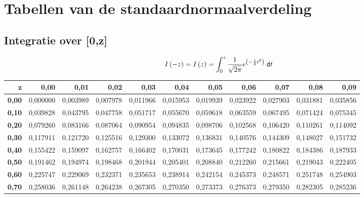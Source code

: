 \newpage
\section{Tabellen van de standaardnormaalverdeling}
\label{sec:Tabellen}

\subsection{Integratie over [0,z]}
\label{sec:EersteTabel}
  \normalsize
  \[
    I\left(-z\right) = I\left(z\right)= \int_0^z \frac{1}{\sqrt{2\pi}} e^{\left( -\frac{1}{2} t^2 \right)}\;\textsf{d}t
  \]
  \footnotesize
  
\begin{tabular}{|r||rrrrr|rrrrr|}
\hline
   {\bf z} & {\bf 0,00} & {\bf 0,01} & {\bf 0,02} & {\bf 0,03} & {\bf 0,04} & {\bf 0,05} & {\bf 0,06} & {\bf 0,07} & {\bf 0,08} & {\bf 0,09} \\
\hline \hline 
{\bf 0,00} &   0,000000 &   0,003989 &   0,007978 &   0,011966 &   0,015953 &   0,019939 &   0,023922 &   0,027903 &   0,031881 &   0,035856 \\

{\bf 0,10} &   0,039828 &   0,043795 &   0,047758 &   0,051717 &   0,055670 &   0,059618 &   0,063559 &   0,067495 &   0,071424 &   0,075345 \\

{\bf 0,20} &   0,079260 &   0,083166 &   0,087064 &   0,090954 &   0,094835 &   0,098706 &   0,102568 &   0,106420 &   0,110261 &   0,114092 \\

{\bf 0,30} &   0,117911 &   0,121720 &   0,125516 &   0,129300 &   0,133072 &   0,136831 &   0,140576 &   0,144309 &   0,148027 &   0,151732 \\

{\bf 0,40} &   0,155422 &   0,159097 &   0,162757 &   0,166402 &   0,170031 &   0,173645 &   0,177242 &   0,180822 &   0,184386 &   0,187933 \\
\hline
{\bf 0,50} &   0,191462 &   0,194974 &   0,198468 &   0,201944 &   0,205401 &   0,208840 &   0,212260 &   0,215661 &   0,219043 &   0,222405 \\

{\bf 0,60} &   0,225747 &   0,229069 &   0,232371 &   0,235653 &   0,238914 &   0,242154 &   0,245373 &   0,248571 &   0,251748 &   0,254903 \\

{\bf 0,70} &   0,258036 &   0,261148 &   0,264238 &   0,267305 &   0,270350 &   0,273373 &   0,276373 &   0,279350 &   0,282305 &   0,285236 \\


\end{tabular}
